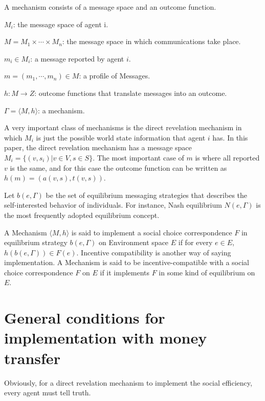  

A mechanism consists of a message space and an outcome function. 

$M_i$: the message space of agent i. 

$M=M_1\times \cdots\times M_n$: the message space in which communications take place.

$m_i \in M_i$: a message reported by agent $i$.

$m=(m_1, \cdots,m_n)\in M$: a profile of Messages.

$h:M\rightarrow Z$: outcome functions that translate messages into an outcome.

$\Gamma=\langle M, h\rangle$: a mechanism.

A very important class of mechanisms is the direct revelation mechanism in which $M_i$ is just the possible world state information 
that agent $i$ has. In this paper, the direct revelation mechanism has a message space $M_i=\{(v, s_i)|v\in V, s \in S \}$. The most
important case of $m$ is where all reported $v$ is the same, and for this case the outcome function can be written as 
$h(m)=(a(v,s),t(v,s))$.

Let $b(e, \Gamma)$ be the set of equilibrium messaging strategies that describes the self-interested behavior of individuals.
For instance, Nash equilibrium $N(e,\Gamma)$ is the most frequently adopted equilibrium concept.

A Mechanism $\langle M, h\rangle$ is said to implement a social choice correspondence $F$ in equilibrium strategy 
$b(e, \Gamma)$ on Environment space $E$ if for every $e\in E$, $h(b(e,\Gamma))\in F(e)$.
Incentive compatibility is another way of saying implementation. A Mechanism is said to be incentive-compatible with a social choice
correspondence $F$ on $E$ if it implements $F$ in some kind of equilibrium on $E$. 








\section{General conditions for implementation with money transfer}



Obviously, for a direct revelation mechanism to implement the social efficiency, every agent must tell truth. 


